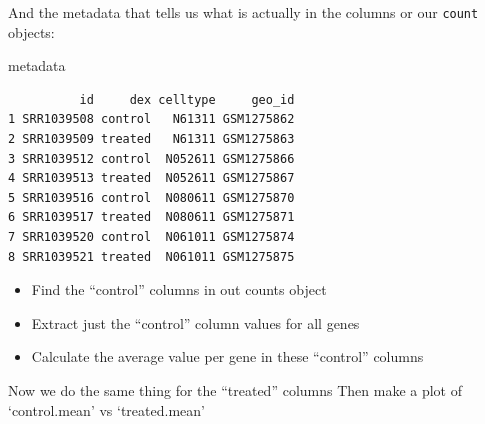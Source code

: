\documentclass[
  letterpaper,
  DIV=11,
  numbers=noendperiod]{scrartcl}
\newenvironment{Shaded}{\begin{snugshade}}{\end{snugshade}}
\newcommand{\FunctionTok}[1]{\textcolor[rgb]{0.28,0.35,0.67}{#1}}
\newcommand{\NormalTok}[1]{\textcolor[rgb]{0.00,0.23,0.31}{#1}}
\newcommand{\OtherTok}[1]{\textcolor[rgb]{0.00,0.23,0.31}{#1}}
\newcommand{\SpecialCharTok}[1]{\textcolor[rgb]{0.37,0.37,0.37}{#1}}
\newcommand{\StringTok}[1]{\textcolor[rgb]{0.13,0.47,0.30}{#1}}
\providecommand{\tightlist}{%
  \setlength{\itemsep}{0pt}\setlength{\parskip}{0pt}}
\begin{document}
And the metadata that tells us what is actually in the columns or our
\texttt{count} objects:

\begin{Shaded}
\begin{Highlighting}[]
\NormalTok{metadata}
\end{Highlighting}
\end{Shaded}

\begin{verbatim}
          id     dex celltype     geo_id
1 SRR1039508 control   N61311 GSM1275862
2 SRR1039509 treated   N61311 GSM1275863
3 SRR1039512 control  N052611 GSM1275866
4 SRR1039513 treated  N052611 GSM1275867
5 SRR1039516 control  N080611 GSM1275870
6 SRR1039517 treated  N080611 GSM1275871
7 SRR1039520 control  N061011 GSM1275874
8 SRR1039521 treated  N061011 GSM1275875
\end{verbatim}

\begin{itemize}
\tightlist
\item
  Find the ``control'' columns in out counts object
\item
  Extract just the ``control'' column values for all genes
\item
  Calculate the average value per gene in these ``control'' columns
\end{itemize}

\begin{Shaded}
\end{Shaded}

Now we do the same thing for the ``treated'' columns Then make a plot of
`control.mean' vs `treated.mean'

\begin{Shaded}
\end{Shaded}
\end{document}
